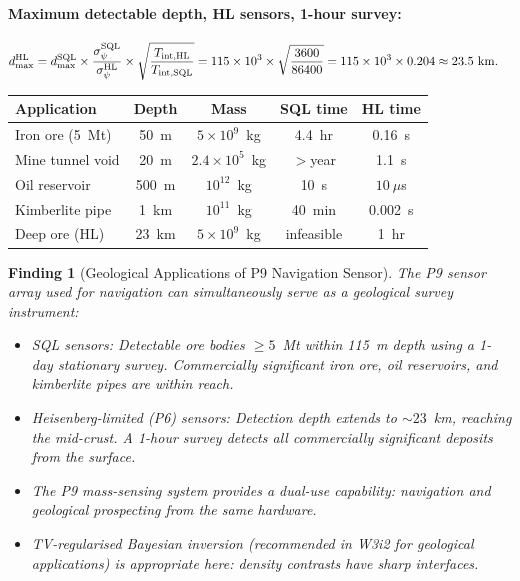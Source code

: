 \documentclass[aps,prd,twocolumn,superscriptaddress,nofootinbib]{revtex4-2}
\newcommand{\SQL}{\mathrm{SQL}}
\newcommand{\HL}{\mathrm{HL}}
\newtheorem{finding}{Finding}
\begin{document}
\paragraph{Maximum detectable depth, HL sensors, 1-hour survey:}
\begin{align}
  d_{\max}^{\HL} &= d_{\max}^{\SQL} \times
  \frac{\sigma_\psi^{\SQL}}{\sigma_\psi^{\HL}} \times
  \sqrt{\frac{T_{\rm int,HL}}{T_{\rm int,SQL}}}
  = 115 \times 10^3 \times \sqrt{\frac{3600}{86400}} = 115\times10^3\times 0.204
  \approx 23.5~\mathrm{km}.
\end{align}

\begin{center}
\begin{tabular}{lcccc}
\toprule
Application & Depth & Mass & SQL time & HL time \\
\midrule
Iron ore (5~Mt) & 50~m & $5\times10^9$~kg & 4.4~hr & 0.16~s \\
Mine tunnel void & 20~m & $2.4\times10^5$~kg & $>$year & 1.1~s \\
Oil reservoir & 500~m & $10^{12}$~kg & 10~s & $10~\mu$s \\
Kimberlite pipe & 1~km & $10^{11}$~kg & 40~min & 0.002~s \\
Deep ore (HL) & 23~km & $5\times10^9$~kg & infeasible & 1~hr \\
\bottomrule
\end{tabular}
\end{center}

\begin{finding}[Geological Applications of P9 Navigation Sensor]
\label{find:geology}
The P9 sensor array used for navigation can \emph{simultaneously} serve
as a geological survey instrument:
\begin{itemize}
  \item SQL sensors: Detectable ore bodies $\geq 5$~Mt within 115~m
    depth using a 1-day stationary survey.  Commercially significant
    iron ore, oil reservoirs, and kimberlite pipes are within reach.
  \item Heisenberg-limited (P6) sensors: Detection depth extends to
    $\sim 23$~km, reaching the mid-crust.  A 1-hour survey detects
    all commercially significant deposits from the surface.
  \item The P9 mass-sensing system provides a dual-use capability:
    navigation and geological prospecting from the same hardware.
  \item TV-regularised Bayesian inversion (recommended in W3i2 for
    geological applications) is appropriate here: density contrasts
    have sharp interfaces.
\end{itemize}
\end{finding}
\end{document}
